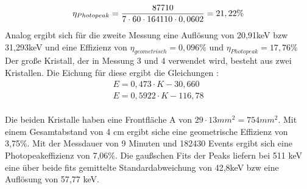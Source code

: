 \documentclass[a4paper,11pt,twoside]{article}
\begin{document}
\begin{equation}
\eta_{Photopeak}={87710\over 7\cdot60\cdot164110\cdot0,0602}=21,22\%
\end{equation}
Analog ergibt sich für die zweite Messung eine Auflösung von 20,91keV bzw 31,293keV und eine Effizienz von $\eta_{geometrisch}=0,096\%$ und $\eta_{Photopeak}=17,76\%$
Der große Kristall, der in Messung 3 und 4 verwendet wird, besteht aus zwei Kristallen. Die Eichung für diese ergibt die Gleichungen :
\begin {align}
E=0,473\cdot K-30,660\\
E=0,5922\cdot K-116,78
\end{align}
\\
Die beiden Kristalle haben eine Frontfläche A von $29 \cdot 13 mm^2=754mm^2$. Mit einem Gesamtabstand von 4 cm ergibt siche eine geometrische Effizienz von 3,75\%. Mit der Messdauer von 9 Minuten und 182430 Events ergibt sich eine Photopeakeffizienz von 7,06\%.
Die gaußschen Fits der Peaks liefern bei 511 keV eine über beide fits gemittelte Standardabweichung von 42,8keV bzw eine Auflösung von 57,77 keV.
%
%
%
%
%
\end{document}
